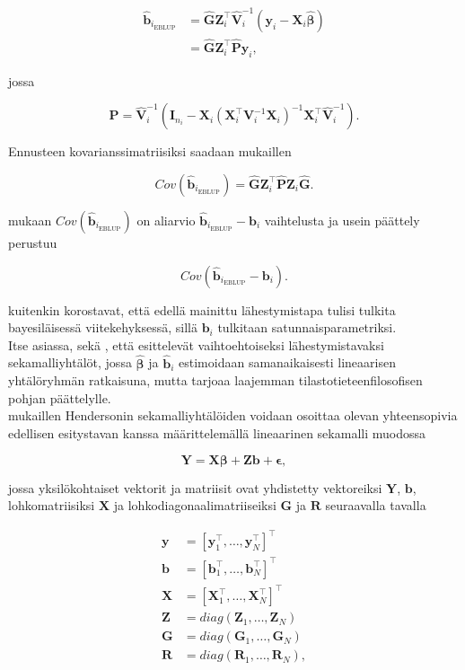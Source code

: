 \documentclass[finnish]{docopts}
\begin{document}
$$
\begin{aligned}
\hat{\bm{b}}_{i_\text{EBLUP}} &= \hat{\bm{G}} \bm{Z}_{i}^\top \hat{\bm{V}}_{i}^{-1}(\bm{y}_i - \bm{X}_i \hat{\bm{\beta}})\\
&= \hat{\bm{G}} \bm{Z}_{i}^\top \hat{\bm{P}}\bm{y}_i,
\end{aligned}
$$

jossa 

$$
\hat{\bm{P}} = \hat{\bm{V}}_{i}^{-1}(\bm{I}_{n_i} - \bm{X}_{i} (\bm{X}_{i}^\top \bm{V}_{i}^{-1} \bm{X}_{i})^{-1} \bm{X}_{i}^\top \hat{\bm{V}}_{i}^{-1}).
$$

Ennusteen kovarianssimatriisiksi saadaan mukaillen

$$
Cov(\hat{\bm{b}}_{i_\text{EBLUP}}) = \hat{\bm{G}} \bm{Z}_{i}^\top \hat{\bm{P}} \bm{Z}_{i} \hat{\bm{G}}.
$$

\cite{verbeke00} mukaan $Cov(\hat{\bm{b}}_{i_\text{EBLUP}})$ on aliarvio $\hat{\bm{b}}_{i_\text{EBLUP}} - \bm{b}_{i}$ vaihtelusta ja usein päättely perustuu

$$
Cov(\hat{\bm{b}}_{i_\text{EBLUP}} - \bm{b}_{i}).
$$

\cite{verbeke00} kuitenkin korostavat, että edellä mainittu lähestymistapa tulisi tulkita bayesiläisessä viitekehyksessä, sillä $\bm{b}_{i}$ tulkitaan satunnaisparametriksi. \\

Itse asiassa, sekä \cite{nissinen09}, että \cite{verbeke00} esittelevät vaihtoehtoiseksi lähestymistavaksi \cite{henderson59} sekamalliyhtälöt, jossa $\hat{\bm{\beta}}$ ja $\hat{\bm{b}}_i$ estimoidaan samanaikaisesti lineaarisen yhtälöryhmän ratkaisuna, mutta \cite{verbeke00} tarjoaa laajemman tilastotieteenfilosofisen pohjan päättelylle.\\

\cite{verbeke00} mukaillen Hendersonin sekamalliyhtälöiden voidaan osoittaa olevan yhteensopivia edellisen esitystavan kanssa määrittelemällä lineaarinen sekamalli muodossa

$$
\bm{Y} = \bm{X} \bm{\beta} + \bm{Z} \bm{b} + \bm{\epsilon},
$$

jossa yksilökohtaiset vektorit ja matriisit ovat yhdistetty vektoreiksi $\bm{Y}$, $\bm{b}$, lohkomatriisiksi $\bm{X}$ ja lohkodiagonaalimatriiseiksi $\bm{G}$ ja $\bm{R}$ seuraavalla tavalla

$$
\begin{aligned}
\bm{y} &= [\bm{y}_{1}^\top, \dots, \bm{y}_{N}^\top]^\top \\
\bm{b} &= [\bm{b}_{1}^\top, \dots, \bm{b}_{N}^\top]^\top \\
\bm{X} &= [\bm{X}_{1}^\top, \dots, \bm{X}_{N}^\top]^\top \\
\bm{Z} &= diag(\bm{Z}_{1}, \dots, \bm{Z}_{N}) \\
\bm{G} &= diag(\bm{G}_{1}, \dots, \bm{G}_{N}) \\
\bm{R} &= diag(\bm{R}_{1}, \dots, \bm{R}_{N}), \\
\end{aligned}
$$
\end{document}
